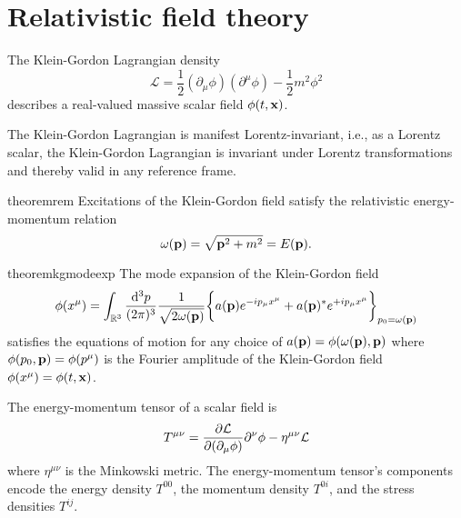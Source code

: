 \section{Relativistic field theory}

\begin{definition}
	The Klein-Gordon Lagrangian density
	\begin{equation}
		\mathcal{L}
		=
		\frac{1}{2}
		\left(\partial_\mu\phi\right)
		\left(\partial^\mu\phi\right)
		-
		\frac{1}{2}
		m^2\phi^2
		\label{eq:kg_lagrangian}
	\end{equation}
	describes a real-valued massive scalar field $\phi(t,\vb{x})$.
\end{definition}
The Klein-Gordon Lagrangian is manifest Lorentz-invariant, i.e., as a Lorentz scalar, the Klein-Gordon Lagrangian is invariant under Lorentz transformations and thereby valid in any reference frame.
\begin{restatable}{theorem}{rem}\label{th:relativistic_energy_momentum}
	Excitations of the Klein-Gordon field satisfy the relativistic energy-momentum relation
	\begin{equation}
		\omega(\vb{p})
		=
		\sqrt{\vb{p}^2+m^2}
		=
		E(\vb{p})
		\label{eq:energy_momentum_relation}
		.
	\end{equation}
\end{restatable}
\begin{restatable}{theorem}{kgmodeexp}\label{thm:kg_mode_expansion}
	The mode expansion of the Klein-Gordon field
	\begin{equation}
		\phi(x^\mu)
		=
		\int_{\mathbb{R}^3}\frac{\dd[3]{p}}{(2\pi)^3}
		\frac{1}{\sqrt{2\omega(\vb{p})}}
		\biggl\{
			a(\vb{p})
			e^{-ip_\mu x^\mu}
			+
			a(\vb{p})^*
			e^{+ip_\mu x^\mu}
		\biggr\}_{p_0=\omega(\vb{p})}
		\label{eq:kg_mode_expansion}
	\end{equation}
	satisfies the equations of motion for any choice of $a(\vb{p})=\phi(\omega(\vb{p}),\vb{p})$ where $\phi(p_0,\vb{p})=\phi(p^\mu)$ is the Fourier amplitude of the Klein-Gordon field $\phi(x^\mu)=\phi(t,\vb{x})$.
\end{restatable}
\begin{definition}
	The energy-momentum tensor of a scalar field is
	\begin{equation}
		T^{\mu\nu}
		=
		\pdv{\mathcal{L}}{(\partial_\mu\phi)}\partial^\nu\phi
		-
		\eta^{\mu\nu}\mathcal{L}
		\label{eq:energy_momentum_tensor}
	\end{equation}
	where $\eta^{\mu\nu}$ is the Minkowski metric.
	The energy-momentum tensor's components encode the energy density $T^{00}$, the momentum density $T^{0i}$, and the stress densities $T^{ij}$.
\end{definition}
